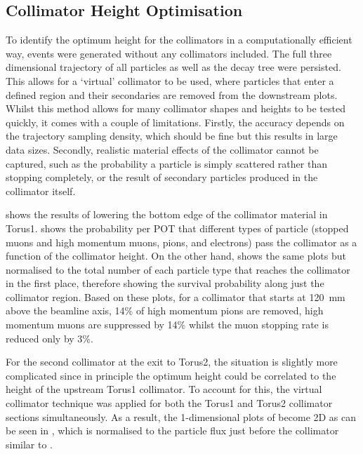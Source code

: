 \subsection{Collimator Height Optimisation}
To identify the optimum height for the collimators in a computationally efficient way, events were generated without any collimators included.
The full three dimensional trajectory of all particles as well as the decay tree were persisted.
This allows for a `virtual' collimator to be used, where particles that enter a defined region and their secondaries are removed from the downstream plots.
Whilst this method allows for many collimator shapes and heights to be tested quickly, it comes with a couple of limitations.
Firstly, the accuracy depends on the trajectory sampling density, which should be fine but this results in large data sizes.
Secondly, realistic material effects of the collimator cannot be captured, such as the probability a particle is simply scattered rather than stopping completely, or the result of secondary particles produced in the collimator itself.

 shows the results of lowering the bottom edge of the collimator material in Torus1.
 shows the probability per \ac{POT} that different types of particle (stopped muons and high momentum muons, pions, and electrons) pass the collimator as a function of the collimator height.
On the other hand,  shows the same plots but normalised to the total number of each particle type that reaches the collimator in the first place, therefore showing the survival probability along just the collimator region.
Based on these plots, for a collimator that starts at 120~mm above the beamline axis, 14\% of high momentum pions are removed, high momentum muons are suppressed by 14\% whilst the muon stopping rate is reduced only by 3\%.

\FigOptimMuBeamCollimTorusTwoContours

For the second collimator at the exit to Torus2, the situation is slightly more complicated since in principle the optimum height could be correlated to the height of the upstream Torus1 collimator.
To account for this, the virtual collimator technique was applied for both the Torus1 and Torus2 collimator sections simultaneously.
As a result, the 1-dimensional plots of  become 2D as can be seen in 
, which is normalised to the particle flux just before the collimator similar to .

